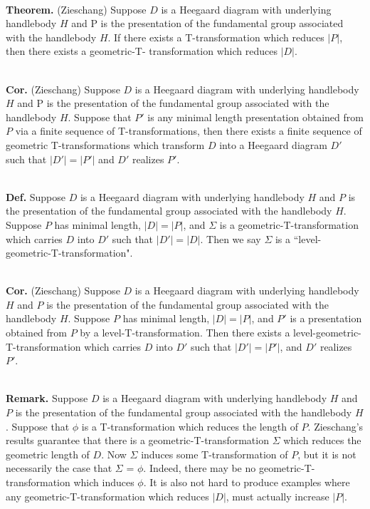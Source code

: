 \documentclass[12pt]{amsart}
\newcommand{\definition}{\ \\ \noindent \textbf{Def.} }
\newcommand{\theorem}{\ \\ \noindent  \textbf{Theorem.} }
\newcommand{\remark}{\ \\ \noindent \textbf{Remark.} }
\newcommand{\corollary}{\ \\ \noindent \textbf{Cor.} }
\begin{document}
\theorem (Zieschang) Suppose $D$ is a Heegaard diagram with underlying handlebody $H$ and P
        is the presentation of the fundamental group associated with the handlebody $H$. If there
        exists a T-transformation which reduces $|P|$, then there exists a geometric-T-
        transformation which reduces $|D|$.
        
\corollary      (Zieschang) Suppose $D$ is a Heegaard diagram with underlying handlebody $H$ and P
        is the presentation of the fundamental group associated with the handlebody $H$. Suppose
        that $P'$ is any minimal length presentation obtained from $P$ via a finite sequence of
        T-transformations, then there exists a finite sequence of geometric T-transformations
        which transform $D$ into a Heegaard diagram $D'$ such that $|D'| = |P'|$ and $D'$ realizes $P'$.

\definition     Suppose $D$ is a Heegaard diagram with underlying handlebody $H$ and $P$ is the
        presentation of the fundamental group associated with the handlebody $H$. Suppose $P$ has
        minimal length, $|D| = |P|$, and $\Sigma$ is a geometric-T-transformation which carries
        $D$ into $D'$ such that $|D'| = |D|$. Then we say $\Sigma$ is a  ``level-geometric-T-transformation".     
        
\corollary      (Zieschang)      Suppose $D$ is a Heegaard diagram with underlying handlebody $H$ and $P$
        is the presentation of the fundamental group associated with the handlebody $H$. Suppose
        $P$ has minimal length, $|D| = |P|$, and $P'$ is a presentation obtained from $P$ by a
        level-T-transformation. Then there exists a level-geometric-T-transformation which
        carries $D$ into $D'$ such that $|D'| = |P'|$, and $D'$ realizes $P'$.
        
\remark Suppose $D$ is a Heegaard diagram with underlying handlebody $H$ and $P$ is the
        presentation of the fundamental group associated with the handlebody $H$. Suppose that
        $\phi$ is a T-transformation which reduces the length of $P$. Zieschang's results guarantee
        that there is a geometric-T-transformation $\Sigma$ which reduces the geometric length of $D$.
        Now $\Sigma$ induces some T-transformation of $P$, but it is not necessarily the case that
        $\Sigma$ = $\phi$. Indeed, there may be no geometric-T-transformation which induces $\phi$. It is also
        not hard to produce examples where any geometric-T-transformation which reduces $|D|$,
        must actually increase $|P|$.
                
\end{document}
